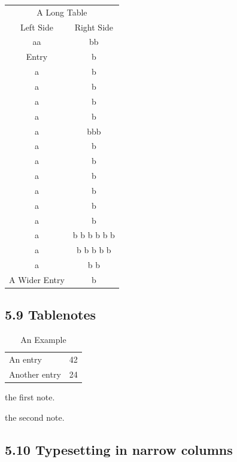 \documentclass{article}
\begin{document}
 \begin{longtable}{cc}
 \multicolumn{2}{c}{A Long Table}\\
 Left Side & Right Side\\
 \hline
 \endhead
 \hline
 \endfoot
 aa & bb\\
 Entry & b\\
 a & b\\
 a & b\\
 a & b\\
 a & b\\
 a & bbb\\
 a & b\\
 a & b\\
 a & b\\
 a & b\\
 a & b\\
 a & b\\
 a & b b b b b b\\
 a & b b b b b\\
 a & b b\\
 A Wider Entry & b\\
 \end{longtable}

\subsection*{ 5.9 Tablenotes}

 \begin{table}
 \begin{threeparttable}
 \caption{An Example}
 \begin{tabular}{ll}
 An entry & 42\tnote{1}\\
 Another entry & 24\tnote{2}\\
 \end{tabular}
 \begin{tablenotes}
 \item [1] the first note.
 \item [2] the second note.
 \end{tablenotes}
 \end{threeparttable}
 \end{table}

\subsection*{ 5.10 Typesetting in narrow columns}
\end{document}
